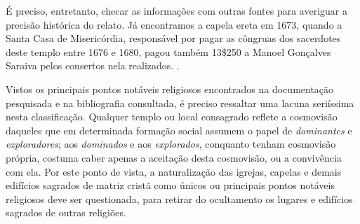 É preciso, entretanto, checar as informações com outras fontes para averiguar a precisão histórica do relato. Já encontramos a capela ereta em 1673, quando a Santa Casa de Misericórdia, responsável por pagar as côngruas dos sacerdotes deste templo entre 1676 e 1680, pagou também 13\$250 a Manoel Gonçalves Saraiva pelos consertos nela realizados. \cite[p.~11]{ott_engenhos_1996}. 

Vistos os principais pontos notáveis religiosos encontrados na documentação pesquisada e na bibliografia consultada, é preciso ressaltar uma lacuna seriíssima nesta classificação. Qualquer templo ou local consagrado reflete a cosmovisão daqueles que em determinada formação social assumem o papel de \textit{dominantes} e \textit{exploradores}; aos \textit{dominados} e aos \textit{explorados}, conquanto tenham cosmovisão própria, costuma caber apenas a aceitação desta cosmovisão, ou a convivência com ela. Por este ponto de vista, a naturalização das igrejas, capelas e demais edifícios sagrados de matriz cristã como únicos ou principais pontos notáveis religiosos deve ser questionada, para retirar do ocultamento os lugares e edifícios sagrados de outras religiões.

